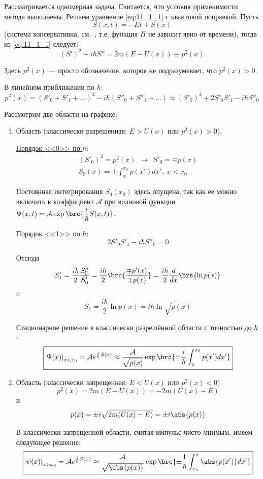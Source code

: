 Рассматривается одномерная задача. Считается, что условия применимости метода выполнены. Решаем уравнение \eqref{eq:11_1_1} с квантовой поправкой. Пусть 
$$
S(x,t) = -Et + S(x)
$$
(система консервативна, см.~, т.е. функция $H$ не зависит явно от времени), тогда из \eqref{eq:11_1_1} следует:
$$
(S')^2 - i\hbar S'' = 2m(E-U(x)) \equiv p^2(x)
$$

Здесь $p^2(x)$ --- просто обозначение, которое не подразумевает, что $p^2(x) > 0$.

В линейном приближении по $\hbar$:
$$
p^2(x) = (S'_0 + S'_1 + \dots)^2 - i\hbar(S''_0+S''_1+\dots) \approx (S'_0)^2 + 2 S'_0 S'_1 - i\hbar S''_0
$$

Рассмотрим две области на графике:
\renewcommand{\labelenumi}{(\alph{enumi})}
\begin{enumerate}
\item Область  (классически разрешенная: $E > U(x)$ или $p^2(x)>0$).

\underline{Порядок <<0>> по $\hbar$}:
$$
\begin{gathered}
(S'_0)^2 = p^2(x) ~~ \rightarrow~~ S'_0 = \mp p(x)\\
\boxed{S_0(x) = \pm \int_x^{x_0} p(x')dx',~ x<x_0}
\end{gathered}
$$

Постоянная интегрирования $S_0(x_0)$ здесь опущена, так как ее можно включить в коэффициент $\mathcal{A}$ при волновой функции $\Psi(x, t) = \mathcal{A} \exp \brc{\dfrac{i}{\hbar} S(x, t)}$.

\underline{Порядок <<1>> по $\hbar$}:
$$
2 S'_0 S'_1 - i\hbar S''_0 = 0
$$

Отсюда
$$
S'_1 = \frac{i\hbar}{2} \frac{S''_0}{S'_0} = \frac{i\hbar}{2} \brc{\frac{\mp p'(x)}{\mp p(x)}} = \frac{i\hbar}{2} \frac{d}{dx}\brs{\ln p(x)}
$$
и
$$
S_1 = \frac{i\hbar}{2} \ln p(x) = \boxed{i\hbar \ln \sqrt{p(x)}}
$$

Стационарное решение в классически разрешённой области с точностью до $\hbar$:
$$
\boxed{\left. \Psi(x) \right|_{x<x_0} = \mathcal{A} e^{\frac{i}{h} S(x)} \approx \frac{\mathcal{A}}{\sqrt{p(x)}} \exp \brc{\pm\frac{i}{\hbar}\int_x^{x_0} p(x')dx'} }
$$

\item Область  (классически запрещенная: $E<U(x)$ или $p^2(x)<0$).
$$
p^2(x) = 2m(E-U(x)) = -2m(U(x)-E)
$$
и
$$
p(x) = \pm i \sqrt{2m(U(x)-E)} = \pm i \abs{p(x)}
$$

В классически запрещенной области, считая импульс чисто мнимым, имеем следующее решение:
$$
\boxed{\left. \psi(x) \right|_{x>x_0} = \mathcal{A} e^{\frac{i}{\hbar} S(x)} \approx \frac{\mathcal{A}}{\sqrt{\abs{p(x)}}} \exp \brc{\pm\frac{1}{\hbar}\int_{x_0}^{x} \abs{p(x')}dx'} }
$$
\end{enumerate}

